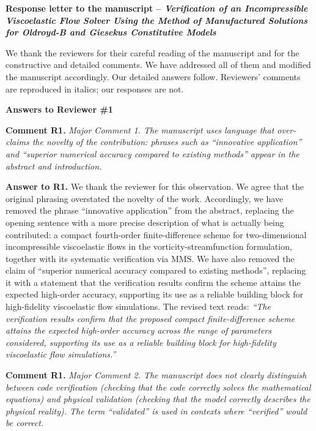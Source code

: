 \documentclass[12pt]{article}
\newcounter{question}
\newcommand{\name}{00}
\newcommand{\question}[1]{\stepcounter{question} \noindent \textbf{Comment \name.\thequestion} \emph{#1} }
\newcommand{\answer}[1]{\noindent \textbf{Answer to \name.\thequestion} #1 \mbox{}\\}
\newcommand{\newperson}[2]{\renewcommand{\name}{#2} \setcounter{question}{0} \newpage \noindent \textbf{\Large Answers to #1} \\}
\begin{document}
{\large \textbf{Response letter to the manuscript
-- \emph{Verification of an Incompressible Viscoelastic Flow Solver Using the Method of Manufactured Solutions for Oldroyd-B and Giesekus Constitutive Models}}}

\vspace{0.8cm}
We thank the reviewers for their careful reading of the manuscript and for the constructive and detailed comments. We have addressed all of them and modified the manuscript accordingly. Our detailed answers follow. Reviewers' comments are reproduced in italics; our responses are not.
\vspace{0.8cm}

\newperson{Reviewer \#1}{R1}

\vspace{3mm}

\question{Major Comment 1. The manuscript uses language that over-claims the novelty of the contribution: phrases such as ``innovative application'' and ``superior numerical accuracy compared to existing methods'' appear in the abstract and introduction.}

\answer{We thank the reviewer for this observation. We agree that the original phrasing overstated the novelty of the work. Accordingly, we have removed the phrase ``innovative application'' from the abstract, replacing the opening sentence with a more precise description of what is actually being contributed: a compact fourth-order finite-difference scheme for two-dimensional incompressible viscoelastic flows in the vorticity-streamfunction formulation, together with its systematic verification via MMS. We have also removed the claim of ``superior numerical accuracy compared to existing methods'', replacing it with a statement that the verification results confirm the scheme attains the expected high-order accuracy, supporting its use as a reliable building block for high-fidelity viscoelastic flow simulations. The revised text reads: \emph{``The verification results confirm that the proposed compact finite-difference scheme attains the expected high-order accuracy across the range of parameters considered, supporting its use as a reliable building block for high-fidelity viscoelastic flow simulations.''}}

\vspace{3mm}

\question{Major Comment 2. The manuscript does not clearly distinguish between code \emph{verification} (checking that the code correctly solves the mathematical equations) and physical \emph{validation} (checking that the model correctly describes the physical reality). The term ``validated'' is used in contexts where ``verified'' would be correct.}
\end{document}

